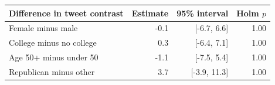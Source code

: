\begin{tabular}{lrrr}
\toprule
Difference in tweet contrast & Estimate & 95\% interval & Holm $p$ \\
\midrule
Female minus male & -0.1 & [-6.7, 6.6] & 1.00 \\
College minus no college & 0.3 & [-6.4, 7.1] & 1.00 \\
Age 50+ minus under 50 & -1.1 & [-7.5, 5.4] & 1.00 \\
Republican minus other & 3.7 & [-3.9, 11.3] & 1.00 \\
\bottomrule
\end{tabular}

